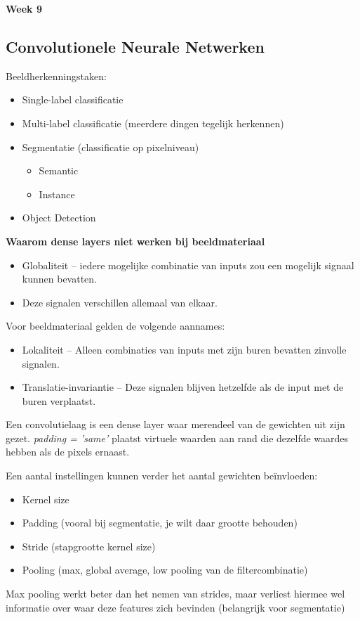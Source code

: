 {\large
\textbf{{\LARGE Week 9}}
\subsection{Convolutionele Neurale Netwerken}
Beeldherkenningstaken:
\begin{itemize}
    \item Single-label classificatie
    \item Multi-label classificatie (meerdere dingen tegelijk herkennen)
    \item Segmentatie (classificatie op pixelniveau)
    \begin{itemize}
        \item Semantic
        \item Instance
    \end{itemize}
    \item Object Detection
\end{itemize}

\textbf{Waarom dense layers niet werken bij beeldmateriaal}
\begin{itemize}
    \item Globaliteit -- iedere mogelijke combinatie van inputs zou een mogelijk signaal kunnen bevatten.
    \item Deze signalen verschillen allemaal van elkaar.
\end{itemize}
Voor beeldmateriaal gelden de volgende aannames:
\begin{itemize}
    \item Lokaliteit -- Alleen combinaties van inputs met zijn buren bevatten zinvolle signalen.
    \item Translatie-invariantie -- Deze signalen blijven hetzelfde als de input met de buren verplaatst.
\end{itemize}
Een convolutielaag is een dense layer waar merendeel van de gewichten uit zijn gezet. \textit{padding = 'same'} plaatst virtuele waarden aan rand die dezelfde waardes hebben als de pixels ernaast.

\noindent Een aantal instellingen kunnen verder het aantal gewichten beïnvloeden:
\begin{itemize}
    \item Kernel size
    \item Padding (vooral bij segmentatie, je wilt daar grootte behouden)
    \item Stride (stapgrootte kernel size)
    \item Pooling (max, global average, low pooling van de filtercombinatie)
\end{itemize}
Max pooling werkt beter dan het nemen van strides, maar verliest hiermee wel informatie over waar deze features zich bevinden (belangrijk voor segmentatie)\\

}
